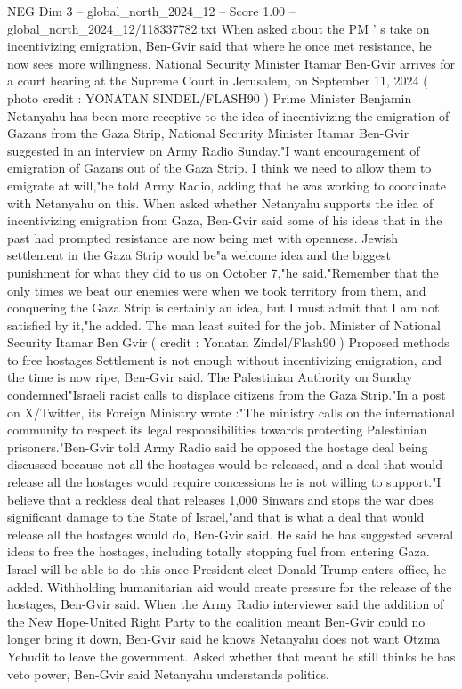 \begin{textsample}{NEG Dim 3 – global\_north\_2024\_12 – Score 1.00 – global\_north\_2024\_12/118337782.txt}  \label{ex:f3_neg_247}
When asked about the PM ' s take on incentivizing emigration, Ben-Gvir said that where he once met resistance, he now sees more willingness.
National Security Minister Itamar Ben-Gvir arrives for a court hearing at the Supreme Court in Jerusalem, on September 11, 2024 ( photo credit : YONATAN SINDEL/FLASH90 ) Prime Minister Benjamin Netanyahu has been more receptive to the idea of incentivizing the emigration of Gazans from the Gaza Strip, National Security Minister Itamar Ben-Gvir suggested in an interview on Army Radio Sunday."I want encouragement of emigration of Gazans out of the Gaza Strip.
I think we need to allow them to emigrate at will,"he told Army Radio, adding that he was working to coordinate with Netanyahu on this.
When asked whether Netanyahu supports the idea of incentivizing emigration from Gaza, Ben-Gvir said some of his ideas that in the past had prompted resistance are now being met with openness.
Jewish settlement in the Gaza Strip would be"a welcome idea and the biggest punishment for what they did to us on October 7,"he said."Remember that the only times we beat our enemies were when we took territory from them, and conquering the Gaza Strip is certainly an idea, but I must admit that I am not satisfied by it,"he added.
The man least suited for the job.
Minister of National Security Itamar Ben Gvir ( credit : Yonatan Zindel/Flash90 ) Proposed methods to free hostages Settlement is not enough without incentivizing emigration, and the time is now ripe, Ben-Gvir said.
The Palestinian Authority on Sunday condemned"Israeli racist calls to displace citizens from the Gaza Strip."In a post on X/Twitter, its Foreign Ministry wrote :"The ministry calls on the international community to respect its legal responsibilities towards protecting Palestinian prisoners."Ben-Gvir told Army Radio said he opposed the hostage deal being discussed because not all the hostages would be released, and a deal that would release all the hostages would require concessions he is not willing to support."I believe that a reckless deal that releases 1,000 Sinwars and stops the war does significant damage to the State of Israel,"and that is what a deal that would release all the hostages would do, Ben-Gvir said.
He said he has suggested several ideas to free the hostages, including totally stopping fuel from entering Gaza.
Israel will be able to do this once President-elect Donald Trump enters office, he added.
Withholding humanitarian aid would create pressure for the release of the hostages, Ben-Gvir said.
When the Army Radio interviewer said the addition of the New Hope-United Right Party to the coalition meant Ben-Gvir could no longer bring it down, Ben-Gvir said he knows Netanyahu does not want Otzma Yehudit to leave the government.
Asked whether that meant he still thinks he has veto power, Ben-Gvir said Netanyahu understands politics.

\end{textsample}
